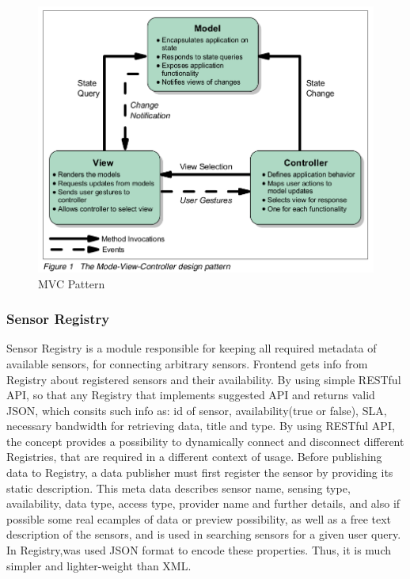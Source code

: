      \begin{figure}[!ht]
     \centering
     \includegraphics[scale=0.7]{images/MVCPattern.png}   
     \caption[MVC Pattern]{MVC Pattern }
     \label{img:MVCPattern}                           
     \end{figure}

	\subsubsection{Sensor Registry}
  Sensor Registry is a module responsible for keeping all required metadata of available sensors, for connecting arbitrary sensors. Frontend gets info from Registry about registered sensors and their availability. By using simple RESTful API, so that any Registry that implements suggested API and returns valid JSON, which consits such info as: id of sensor, availability(true or false), SLA, necessary bandwidth for retrieving data, title and type. By using RESTful API, the concept provides a possibility to dynamically connect and disconnect different Registries, that are required in a different context of usage. 
  Before publishing data to Registry, a data publisher must first register the sensor by providing its static description. This meta data describes sensor name, sensing type, availability, data type, access type, provider name and further details, and also if possible some real ecamples of data or preview possibility, as well as a free text description of the sensors, and is used in searching sensors for a given user query. In Registry,was used JSON format to encode these properties. Thus, it is much simpler and lighter-weight than XML.

